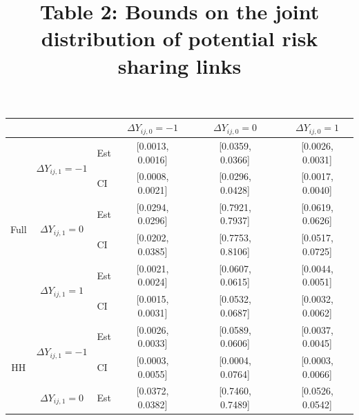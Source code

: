 \documentclass[12pt]{article}
\theoremstyle{definition}
\begin{document}
\begin{table}[htbp]
  \centering
  \title{Table 2: Bounds on the joint distribution of potential risk sharing links} \vspace{5mm}
    \begin{tabular}{cclccccc}\hline\hline
          &       &       & $\Delta Y_{ij,0} = -1$   &       & $\Delta Y_{ij,0} = 0$ &       & $\Delta Y_{ij,0} = 1$ \\
    \midrule
    \multirow{6}[6]{*}{Full} & \multirow{2}[2]{*}{$\Delta Y_{ij,1} = -1$} & Est   & [0.0013, 0.0016] &       & \textcolor[rgb]{ .753,  0,  0}{[0.0359, 0.0366]} &       & \textcolor[rgb]{ .753,  0,  0}{[0.0026, 0.0031]} \\
          &       & CI    & [0.0008, 0.0021] &       & \textcolor[rgb]{ .753,  0,  0}{[0.0296, 0.0428]} &       & \textcolor[rgb]{ .753,  0,  0}{[0.0017, 0.0040]} \\
\cmidrule{2-8}          & \multirow{2}[2]{*}{$\Delta Y_{ij,1} = 0$} & Est   & \textcolor[rgb]{ .188,  .329,  .588}{[0.0294, 0.0296]} &       & [0.7921, 0.7937] &       & \textcolor[rgb]{ .753,  0,  0}{[0.0619, 0.0626]} \\
          &       & CI    & \textcolor[rgb]{ .188,  .329,  .588}{[0.0202, 0.0385]} &       & [0.7753, 0.8106] &       & \textcolor[rgb]{ .753,  0,  0}{[0.0517, 0.0725]} \\
\cmidrule{2-8}          & \multirow{2}[2]{*}{$\Delta Y_{ij,1} = 1$} & Est   & \textcolor[rgb]{ .188,  .329,  .588}{[0.0021, 0.0024]} &       & \textcolor[rgb]{ .188,  .329,  .588}{[0.0607, 0.0615]} &       & [0.0044, 0.0051] \\
          &       & CI    & \textcolor[rgb]{ .188,  .329,  .588}{[0.0015, 0.0031]} &       & \textcolor[rgb]{ .188,  .329,  .588}{[0.0532, 0.0687]} &       & [0.0032, 0.0062] \\
    \midrule
    \multirow{6}[6]{*}{HH} & \multirow{2}[2]{*}{$\Delta Y_{ij,1} = -1$} & Est   & [0.0026, 0.0033] &       & \textcolor[rgb]{ .753,  0,  0}{[0.0589, 0.0606]} &       & \textcolor[rgb]{ .753,  0,  0}{[0.0037, 0.0045]} \\
          &       & CI    & [0.0003, 0.0055] &       & \textcolor[rgb]{ .753,  0,  0}{[0.0004, 0.0764]} &       & \textcolor[rgb]{ .753,  0,  0}{[0.0003, 0.0066]} \\
\cmidrule{2-8}          & \multirow{2}[2]{*}{$\Delta Y_{ij,1} = 0$} & Est   & \textcolor[rgb]{ .188,  .329,  .588}{[0.0372, 0.0382]} &       & [0.7460, 0.7489] &       & \textcolor[rgb]{ .753,  0,  0}{[0.0526, 0.0542]} \\

\end{tabular}
\end{table}
\end{document}
